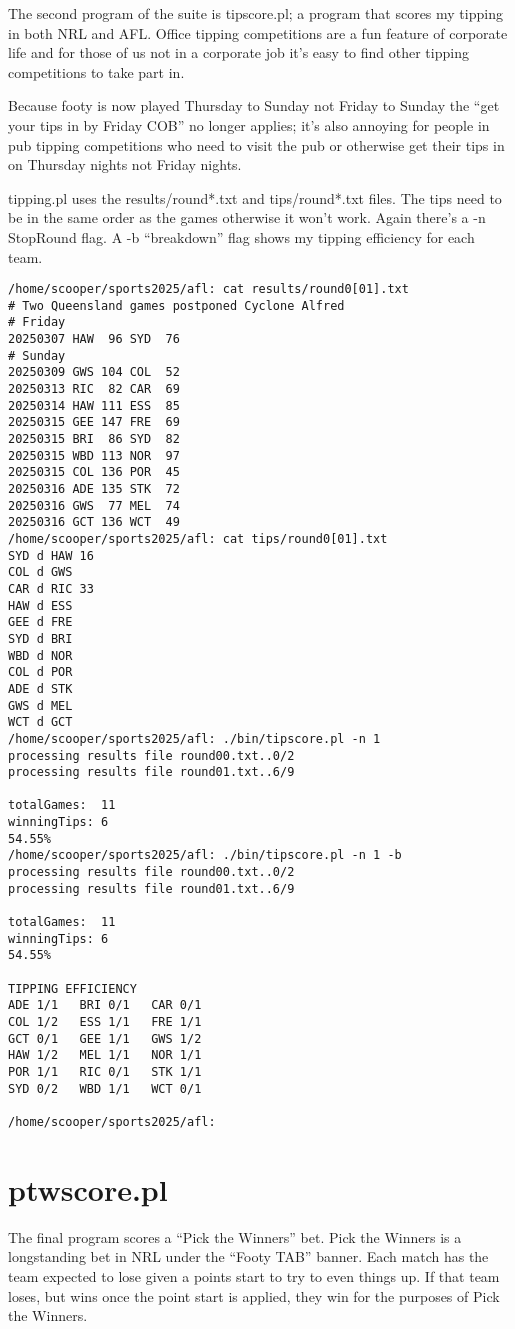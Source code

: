 \documentclass{article}
\begin{document}
The second program of the suite is tipscore.pl; a program that scores
my tipping in both NRL and AFL. Office tipping competitions are a fun
feature of corporate life and for those of us not in a corporate job
it's easy to find other tipping competitions to take part in.

Because footy is now played Thursday to Sunday not Friday to Sunday
the ``get your tips in by Friday COB'' no longer applies; it's also
annoying for people in pub tipping competitions who need to visit the
pub or otherwise get their tips in on Thursday nights not Friday
nights.

tipping.pl uses the results/round*.txt and tips/round*.txt files. The
tips need to be in the same order as the games otherwise it won't
work. Again there's a -n StopRound flag. A -b ``breakdown'' flag shows
my tipping efficiency for each team.

\begin{verbatim}
/home/scooper/sports2025/afl: cat results/round0[01].txt
# Two Queensland games postponed Cyclone Alfred
# Friday
20250307 HAW  96 SYD  76
# Sunday
20250309 GWS 104 COL  52
20250313 RIC  82 CAR  69
20250314 HAW 111 ESS  85
20250315 GEE 147 FRE  69
20250315 BRI  86 SYD  82
20250315 WBD 113 NOR  97
20250315 COL 136 POR  45
20250316 ADE 135 STK  72
20250316 GWS  77 MEL  74
20250316 GCT 136 WCT  49
/home/scooper/sports2025/afl: cat tips/round0[01].txt
SYD d HAW 16
COL d GWS
CAR d RIC 33
HAW d ESS
GEE d FRE
SYD d BRI
WBD d NOR
COL d POR
ADE d STK
GWS d MEL
WCT d GCT
/home/scooper/sports2025/afl: ./bin/tipscore.pl -n 1
processing results file round00.txt..0/2
processing results file round01.txt..6/9

totalGames:  11
winningTips: 6
54.55%
/home/scooper/sports2025/afl: ./bin/tipscore.pl -n 1 -b
processing results file round00.txt..0/2
processing results file round01.txt..6/9

totalGames:  11
winningTips: 6
54.55%

TIPPING EFFICIENCY
ADE 1/1   BRI 0/1   CAR 0/1
COL 1/2   ESS 1/1   FRE 1/1
GCT 0/1   GEE 1/1   GWS 1/2
HAW 1/2   MEL 1/1   NOR 1/1
POR 1/1   RIC 0/1   STK 1/1
SYD 0/2   WBD 1/1   WCT 0/1

/home/scooper/sports2025/afl:
\end{verbatim}

\section{ptwscore.pl}

The final program scores a ``Pick the Winners'' bet. Pick the Winners
is a longstanding bet in NRL under the ``Footy TAB'' banner. Each
match has the team expected to lose given a points start to try to
even things up. If that team loses, but wins once the point start is
applied, they win for the purposes of Pick the Winners.
\end{document}
